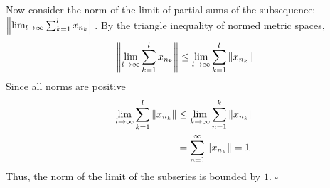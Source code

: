 \documentclass[12pt]{article}
\begin{document}
Now consider the norm of the limit of partial sums of the subsequence: $\norm{\lim_{l\rightarrow\infty}\sum_{k=1}^{l} x_{n_k}}$.  By the triangle inequality of normed metric spaces,
\begin{align*}
	\norm{\lim_{l\rightarrow\infty}\sum_{k=1}^{l} x_{n_k}} \leq \lim_{l\rightarrow\infty}\sum_{k=1}^{l}\norm{x_{n_k}}
\end{align*}
Since all norms are positive
\begin{align*}
	\lim_{l\rightarrow\infty}\sum_{k=1}^{l}\norm{x_{n_k}} &\leq \lim_{k\rightarrow\infty}\sum_{n=1}^k \norm{x_{n_k}} \\
	&= \sum_{n=1}^\infty \norm{x_{n_k}} = 1
\end{align*}
Thus, the norm of the limit of the subseries is bounded by $1$. \hfill $\square$
\end{document}
